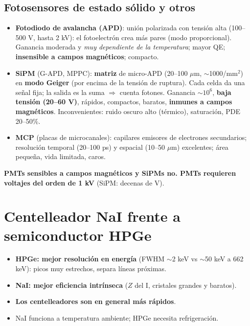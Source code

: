 \subsection{Fotosensores de estado sólido y otros}
\begin{itemize}
\item \textbf{Fotodiodo de avalancha (APD)}: unión polarizada con tensión alta (100--500 V, hasta 2 kV): el fotoelectrón crea más pares
(modo proporcional). Ganancia moderada y \emph{muy dependiente de la temperatura}; mayor QE; \textbf{insensible a campos magnéticos}; compacto.
\item \textbf{SiPM} (G-APD, MPPC): \textbf{matriz} de micro-APD (20--100 $\mu$m, $\sim$1000/mm$^2$) en \textbf{modo Geiger} (por encima de la tensión
de ruptura). Cada celda da una señal fija; la salida es la suma $\Rightarrow$ cuenta fotones. Ganancia $\sim10^6$, \textbf{baja tensión (20--60 V)},
rápidos, compactos, baratos, \textbf{inmunes a campos magnéticos}. Inconvenientes: ruido oscuro alto (térmico), saturación, PDE 20--50\%.
\item \textbf{MCP} (placas de microcanales): capilares emisores de electrones secundarios; resolución temporal (20--100 ps) y espacial (10--50 $\mu$m) excelentes;
área pequeña, vida limitada, caros.
\end{itemize}
\begin{clave}
\textbf{PMTs sensibles a campos magnéticos y SiPMs no. PMTs requieren voltajes del orden de 1 kV} (SiPM: decenas de V).
\end{clave}

\section{Centelleador NaI frente a semiconductor HPGe}
\begin{clave}
\begin{itemize}
\item \textbf{HPGe: mejor resolución en energía} (FWHM $\sim$2 keV vs $\sim$50 keV a 662 keV): picos muy estrechos, separa líneas próximas.
\item \textbf{NaI: mejor eficiencia intrínseca} ($Z$ del I, cristales grandes y baratos).
\item \textbf{Los centelleadores son en general más rápidos}.
\item NaI funciona a temperatura ambiente; HPGe necesita refrigeración.
\end{itemize}
\end{clave}
